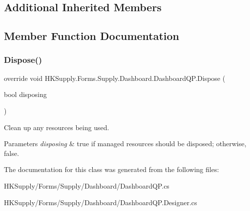 \subsection*{Additional Inherited Members}


\subsection{Member Function Documentation}
\mbox{\label{class_h_k_supply_1_1_forms_1_1_supply_1_1_dashboard_1_1_dashboard_q_p_ae3aa524d36c9c7f15f57a32890c076c3}} 
\subsubsection{\texorpdfstring{Dispose()}{Dispose()}}
{\footnotesize\ttfamily override void H\+K\+Supply.\+Forms.\+Supply.\+Dashboard.\+Dashboard\+Q\+P.\+Dispose (\begin{DoxyParamCaption}\item[{bool}]{disposing }\end{DoxyParamCaption})\hspace{0.3cm}{\ttfamily [protected]}}



Clean up any resources being used. 


\begin{DoxyParams}{Parameters}
{\em disposing} & true if managed resources should be disposed; otherwise, false.\\
\hline
\end{DoxyParams}


The documentation for this class was generated from the following files\+:\begin{DoxyCompactItemize}
\item 
H\+K\+Supply/\+Forms/\+Supply/\+Dashboard/Dashboard\+Q\+P.\+cs\item 
H\+K\+Supply/\+Forms/\+Supply/\+Dashboard/Dashboard\+Q\+P.\+Designer.\+cs\end{DoxyCompactItemize}
